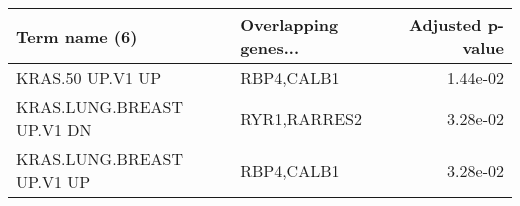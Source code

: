 \begin{tabular}{llr}
\toprule
            Term name (6) & Overlapping genes... &  Adjusted p-value \\
\midrule
         KRAS.50 UP.V1 UP &           RBP4,CALB1 &          1.44e-02 \\
KRAS.LUNG.BREAST UP.V1 DN &         RYR1,RARRES2 &          3.28e-02 \\
KRAS.LUNG.BREAST UP.V1 UP &           RBP4,CALB1 &          3.28e-02 \\
\bottomrule
\end{tabular}
